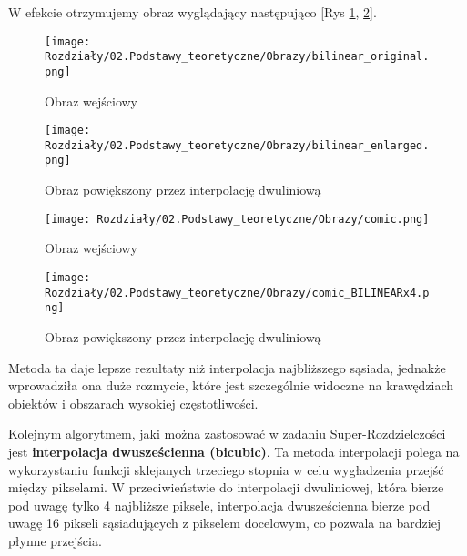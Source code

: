 W efekcie otrzymujemy obraz wyglądający następująco [Rys \ref{fig:image8},  \ref{fig:image10}].

\begin{figure}[H]
    \centering
    \begin{minipage}[t]{0.35\linewidth}
        \texttt{[image: Rozdziały/02.Podstawy\_teoretyczne/Obrazy/bilinear\_original.png]}
        \caption{Obraz wejściowy}
        \label{fig:image7}
    \end{minipage}
    \hspace{0.5cm}
    \begin{minipage}[t]{0.35\linewidth}
        \texttt{[image: Rozdziały/02.Podstawy\_teoretyczne/Obrazy/bilinear\_enlarged.png]}
        \caption{Obraz powiększony przez interpolację dwuliniową}
        \label{fig:image8}
    \end{minipage}
\end{figure}

\begin{figure}[H]
    \centering
    \begin{minipage}[t]{0.35\linewidth}
        \texttt{[image: Rozdziały/02.Podstawy\_teoretyczne/Obrazy/comic.png]}
        \caption{Obraz wejściowy}
        \label{fig:image9}
    \end{minipage}
    \hspace{0.5cm}
    \begin{minipage}[t]{0.35\linewidth}
        \texttt{[image: Rozdziały/02.Podstawy\_teoretyczne/Obrazy/comic\_BILINEARx4.png]}
        \caption{Obraz powiększony przez interpolację dwuliniową}
        \label{fig:image10}
    \end{minipage}
\end{figure}

\newpage
Metoda ta daje lepsze rezultaty niż interpolacja najbliższego sąsiada, jednakże wprowadziła ona duże rozmycie, które jest szczególnie widoczne na krawędziach obiektów i obszarach wysokiej częstotliwości.


Kolejnym algorytmem, jaki można zastosować w zadaniu Super-Rozdzielczości jest \textbf{interpolacja dwusześcienna (bicubic)}. Ta metoda interpolacji polega na wykorzystaniu funkcji sklejanych trzeciego stopnia w celu wygładzenia przejść między pikselami. W przeciwieństwie do interpolacji dwuliniowej, która bierze pod uwagę tylko 4 najbliższe piksele, interpolacja dwusześcienna bierze pod uwagę 16 pikseli sąsiadujących z pikselem docelowym, co pozwala na bardziej płynne przejścia.

